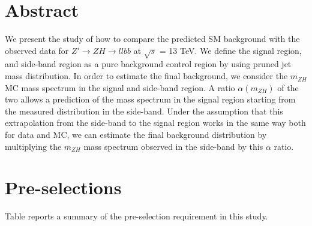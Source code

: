 \documentclass[a0,portrait]{a0poster}
\begin{document}
\begin{multicols}{2} %



  \color{Black} %

  \section*{\color{Crimson} Abstract}

  We present the study of how to compare the predicted SM background with the observed data for $Z' \rightarrow ZH \rightarrow llbb$ at $\sqrt{s}$ = 13 TeV. We define the signal region, and side-band region as a pure background control region by using pruned jet mass distribution. In order to estimate the final background, we consider the $m_{ZH}$ MC mass spectrum in the signal and side-band region. A ratio $\alpha (m_{ZH})$ of the two allows a prediction of the mass spectrum in the signal region starting from the measured distribution in the side-band. Under the assumption that this extrapolation from the side-band to the signal region works in the same way both for data and MC, we can estimate the final background distribution by multiplying the $m_{ZH}$ mass spectrum observed in the side-band by this $\alpha$ ratio.


  \section*{\color{Crimson} Pre-selections}
  
  Table reports a summary of the pre-selection requirement in this study.
  

\end{multicols}
\end{document}
